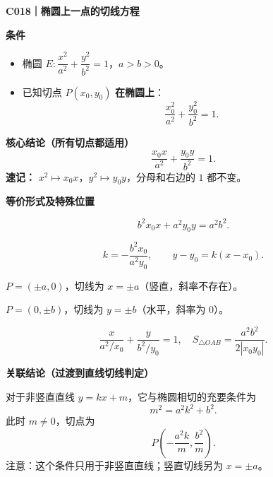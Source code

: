 \begin{statementbox}
\textbf{\textcolor{CStatement}{C018｜椭圆上一点的切线方程}}

\medskip
\textbf{\textcolor{CStatement}{条件}}
\begin{itemize}[leftmargin=*, itemsep=0.35em]
    \item 椭圆 $E:\dfrac{x^2}{a^2}+\dfrac{y^2}{b^2}=1$，$a>b>0$。
    \item 已知切点 $P(x_0,y_0)$ \textbf{在椭圆上}：
    \[
    \frac{x_0^2}{a^2}+\frac{y_0^2}{b^2}=1.
    \]
\end{itemize}

\textbf{\textcolor{CStatement}{核心结论（所有切点都适用）}}
\[
\boxed{\frac{x_0x}{a^2}+\frac{y_0y}{b^2}=1.}
\]
\textbf{速记：} $x^2\mapsto x_0x$，$y^2\mapsto y_0y$，分母和右边的 $1$ 都不变。

\medskip
\textbf{\textcolor{CStatement}{等价形式及特殊位置}}
\begin{description}[style=nextline, leftmargin=2.8em, labelsep=0.5em, itemsep=0.45em]
    \item[\textbf{一般式（无需讨论斜率）：}]
    \[
      b^2x_0x+a^2y_0y=a^2b^2.
    \]
    \item[\textbf{斜率（仅 $y_0\ne0$）：}]
    \[
      k=-\frac{b^2x_0}{a^2y_0},\qquad
      y-y_0=k(x-x_0).
    \]
    \item[\textbf{左右顶点（$y_0=0$）：}]
    $P=(\pm a,0)$，切线为 $x=\pm a$（竖直，斜率不存在）。
    \item[\textbf{上下顶点（$x_0=0$）：}]
    $P=(0,\pm b)$，切线为 $y=\pm b$（水平，斜率为 $0$）。
    \item[\textbf{截距（仅 $x_0y_0\ne0$）：}]
    \[
      \frac{x}{a^2/x_0}+\frac{y}{b^2/y_0}=1,
      \quad S_{\triangle OAB}=\frac{a^2b^2}{2|x_0y_0|}.
    \]
\end{description}

\textbf{\textcolor{CStatement}{关联结论（过渡到直线切线判定）}}

对于非竖直直线 $y=kx+m$，它与椭圆相切的充要条件为
\[
\boxed{m^2=a^2k^2+b^2.}
\]
此时 $m\ne0$，切点为
\[
\boxed{P\left(-\frac{a^2k}{m},\frac{b^2}{m}\right).}
\]
注意：这个条件只用于非竖直直线；竖直切线另为 $x=\pm a$。
\end{statementbox}
